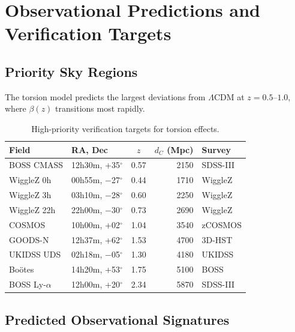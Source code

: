 \documentclass[twocolumn,prd,superscriptaddress,nofootinbib]{revtex4-2}
\begin{document}
\section{Observational Predictions and Verification Targets}
\label{sec:predictions}

\subsection{Priority Sky Regions}

The torsion model predicts the largest deviations from $\Lambda$CDM at $z = 0.5$--$1.0$, where $\beta(z)$ transitions most rapidly.

\begin{table}[h]
\caption{High-priority verification targets for torsion effects.}
\label{tab:targets}
\begin{ruledtabular}
\begin{tabular}{llcrl}
Field & RA, Dec & $z$ & $d_C$ (Mpc) & Survey \\
\hline
BOSS CMASS & 12h30m, +35$^\circ$ & 0.57 & 2150 & SDSS-III \\
WiggleZ 0h & 00h55m, $-$27$^\circ$ & 0.44 & 1710 & WiggleZ \\
WiggleZ 3h & 03h10m, $-$28$^\circ$ & 0.60 & 2250 & WiggleZ \\
WiggleZ 22h & 22h00m, $-$30$^\circ$ & 0.73 & 2690 & WiggleZ \\
COSMOS & 10h00m, +02$^\circ$ & 1.04 & 3540 & zCOSMOS \\
GOODS-N & 12h37m, +62$^\circ$ & 1.53 & 4700 & 3D-HST \\
UKIDSS UDS & 02h18m, $-$05$^\circ$ & 1.30 & 4180 & UKIDSS \\
Bo\"otes & 14h20m, +53$^\circ$ & 1.75 & 5100 & BOSS \\
BOSS Ly-$\alpha$ & 12h00m, +20$^\circ$ & 2.34 & 5870 & SDSS-III \\
\end{tabular}
\end{ruledtabular}
\end{table}

\subsection{Predicted Observational Signatures}
\end{document}

